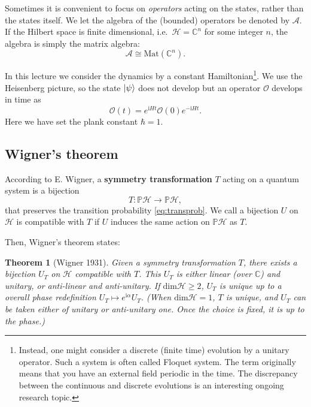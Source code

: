\documentclass[
]{scrartcl}
\numberwithin{equation}{section}
\newtheorem{theorem}{Theorem}[section]
\theoremstyle{definition}
\theoremstyle{definition}
\theoremstyle{definition}
\theoremstyle{definition}
\theoremstyle{remark}
\begin{document}
Sometimes it is convenient to focus on \emph{operators} acting on the states, rather than the states itself.
We let the algebra of the (bounded) operators be denoted by \(\mathcal{A}\).
If the Hilbert space is finite dimensional, i.e.~\(\mathcal{H} = \mathbb{C}^n\) for some integer \(n\),
the algebra is simply the matrix algebra:
\begin{equation}
  \label{eq:Amatrix}
  \mathcal{A} \cong \mathrm{Mat}(\mathbb{C}^n).
\end{equation}

In this lecture we consider the dynamics by a constant Hamiltonian\footnote{Instead, one might consider a discrete (finite time) evolution by a unitary operator.
  Such a system is often called Floquet system. The term originally means that you have an external field periodic in the time. The discrepancy between the continuous and discrete evolutions is an interesting ongoing research topic.}.
We use the Heisenberg picture, so the state \(\ket{\psi}\) does not develop but an operator \(\mathcal{O}\)
develops in time as
\begin{equation}
  \label{eq:Odev}
  \mathcal{O}(t) = e^{\mathrm{i}H t} \mathcal{O}(0) e^{-\mathrm{i}H t}.
\end{equation}
Here we have set the plank constant \(\hbar =1\).

\hypertarget{wigners-theorem}{%
\subsection{Wigner's theorem}\label{wigners-theorem}}

According to E. Wigner, a \textbf{symmetry transformation} \(T\) acting on a quantum system is a bijection
\begin{equation}
  \label{eq:sym}
  T: \mathbb{P}\mathcal{H} \to \mathbb{P}\mathcal{H},
\end{equation}
that preserves the transition probability \eqref{eq:transprob}.
We call a bijection \(U\) on \(\mathcal{H}\) is compatible with \(T\) if \(U\) induces the same action on \(\mathbb{P}\mathcal{H}\) as \(T\).

Then, Wigner's theorem states:

\begin{theorem}[Wigner 1931]
Given a symmetry transformation \(T\), there exists a bijection \(U_T\) on \(\mathcal{H}\) compatible with \(T\).
This \(U_T\) is either linear (over \(\mathbb{C}\)) and unitary, or anti-linear and anti-unitary. If \(\mathrm{dim}\mathcal{H}\ge 2\), \(U_T\) is unique up to a overall phase redefinition \(U_T \mapsto e^{\mathrm{i}\alpha}U_T\). (When \(\mathrm{dim}\mathcal{H} = 1\), \(T\) is unique, and \(U_T\) can be taken either of unitary or anti-unitary one. Once the choice is fixed, it is up to the phase.)
\end{theorem}
\end{document}
